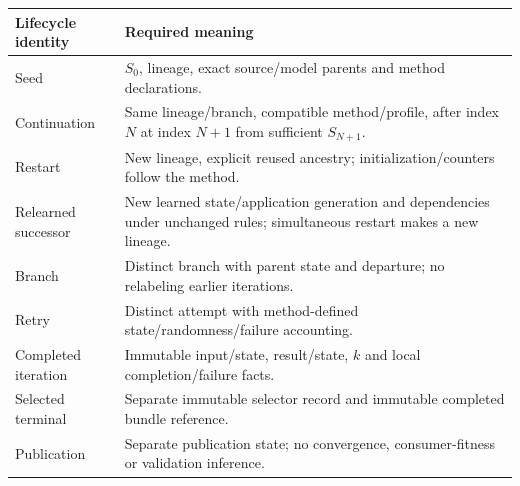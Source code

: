 {{\begin{longtable}{>{\raggedright\arraybackslash}p{.28\linewidth}>{\raggedright\arraybackslash}p{.65\linewidth}}
\toprule Lifecycle identity & Required meaning \\\midrule
Seed & $S_0$, lineage, exact source/model parents and method declarations.\\
Continuation & Same lineage/branch, compatible method/profile, after index $N$ at index $N+1$ from sufficient $S_{N+1}$.\\
Restart & New lineage, explicit reused ancestry; initialization/counters follow the method.\\
Relearned successor & New learned state/application generation and dependencies under unchanged rules; simultaneous restart makes a new lineage.\\
Branch & Distinct branch with parent state and departure; no relabeling earlier iterations.\\
Retry & Distinct attempt with method-defined state/randomness/failure accounting.\\
Completed iteration & Immutable input/state, result/state, $k$ and local completion/failure facts.\\
Selected terminal & Separate immutable selector record and immutable completed bundle reference.\\
Publication & Separate publication state; no convergence, consumer-fitness or validation inference.\\
\bottomrule
\end{longtable}
\normalsize
{}
}}
